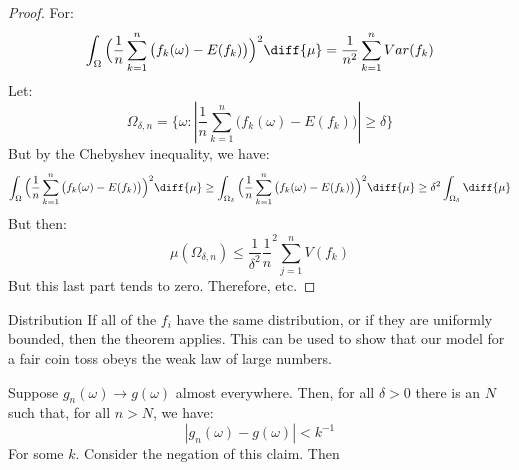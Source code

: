             \begin{proof}
                For:
                \begin{equation}
                    \int_{\Omega}\Big(\frac{1}{n}\sum_{k=1}^{n}\big(
                        f_{k}(\omega)-E(f_{k})\big)\Big)^{2}\diff{\mu}
                    =\frac{1}{n^{2}}\sum_{k=1}^{n}Var(f_{k})
                \end{equation}
                Let:
                \begin{equation}
                    \Omega_{\delta,n}=
                    \{\omega:|\frac{1}{n}\sum_{k=1}^{n}
                        \big(f_{k}(\omega)-E(f_{k})\big)|\geq\delta\}
                \end{equation}
                But by the Chebyshev inequality, we have:
                \begin{equation}
                    \int_{\Omega}\Big(\frac{1}{n}\sum_{k=1}^{n}\big(
                        f_{k}(\omega)-E(f_{k})\big)\Big)^{2}\diff{\mu}
                    \geq\int_{\Omega_{\delta}}
                        \Big(\frac{1}{n}\sum_{k=1}^{n}\big(
                        f_{k}(\omega)-E(f_{k})\big)\Big)^{2}\diff{\mu}
                    \geq\delta^{2}\int_{\Omega_{\delta}}\diff{\mu}
                \end{equation}
                But then:
                \begin{equation}
                    \mu(\Omega_{\delta,n})\leq
                    \frac{1}{\delta^{2}}\frac{1}{n}^{2}
                    \sum_{j=1}^{n}V(f_{k})
                \end{equation}
                But this last part tends to zero. Therefore, etc.
            \end{proof}
            \begin{lexample}{}{Distribution}
                If all of the $f_{i}$ have the same distribution, or
                if they are uniformly bounded, then the theorem applies.
                This can be used to show that our model for a fair
                coin toss obeys the weak law of large numbers.
            \end{lexample}
            Suppose $g_{n}(\omega)\rightarrow{g}(\omega)$ almost
            everywhere. Then, for all $\delta>0$ there is an
            $N$ such that, for all $n>N$, we have:
            \begin{equation}
                |g_{n}(\omega)-g(\omega)|<k^{\minus{1}}
            \end{equation}
            For some $k$. Consider the negation of this claim. Then
